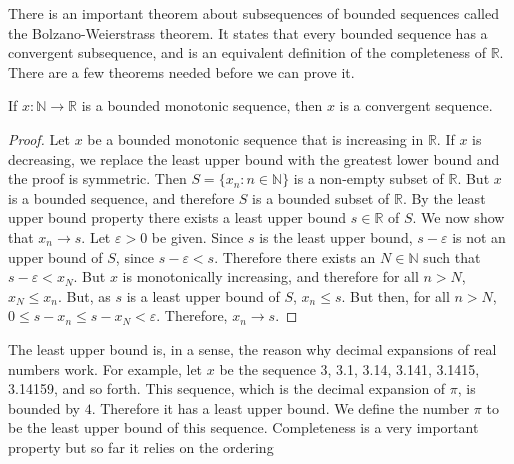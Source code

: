         There is an important theorem about
        subsequences of bounded sequences called the
        Bolzano-Weierstrass theorem. It states that
        every bounded sequence has a convergent subsequence,
        and is an equivalent definition of the
        completeness of $\mathbb{R}$. There are a few theorems
        needed before we can prove it.
        \begin{theorem}
            \label{th:funct:bounded_monotone_%
                   sequences_converge}
            If $x:\mathbb{N}\rightarrow\mathbb{R}$
            is a bounded monotonic sequence,
            then $x$ is a convergent sequence.
        \end{theorem}
        \begin{proof}
            Let $x$ be a bounded monotonic sequence that
            is increasing in $\mathbb{R}$.
            If $x$ is decreasing, we replace the least
            upper bound with the greatest lower
            bound and the proof is symmetric.
            Then $S=\{x_{n}:n\in\mathbb{N}\}$ is a
            non-empty subset of $\mathbb{R}$. But $x$ is
            a bounded sequence, and therefore $S$ is a
            bounded subset of $\mathbb{R}$. By the least
            upper bound property there exists a least
            upper bound $s\in\mathbb{R}$ of $S$.
            We now show that $x_{n}\rightarrow{s}$.
            Let $\varepsilon>0$ be given. Since $s$ is
            the least upper bound, $s-\varepsilon$
            is not an upper bound of $S$, since
            $s-\varepsilon<s$. Therefore there exists
            an $N\in\mathbb{N}$ such that
            $s-\varepsilon<x_{N}$. But $x$ is
            monotonically increasing, and therefore
            for all $n>N$, $x_{N}\leq{x_{n}}$.
            But, as $s$ is a least upper
            bound of $S$, $x_{n}\leq{s}$. But then,
            for all $n>N$,
            $0\leq{s-x_{n}}\leq{s-x_{N}}<\varepsilon$.
            Therefore, $x_{n}\rightarrow{s}$.
        \end{proof}
        The least upper bound is, in a sense, the
        reason why decimal expansions of
        real numbers work. For example, let $x$ be the
        sequence 3, 3.1, 3.14, 3.141, 3.1415, 3.14159,
        and so forth. This sequence, which is
        the decimal expansion of $\pi$, is bounded by $4$.
        Therefore it has a least upper bound.
        We define the number $\pi$
        to be the least upper bound of this sequence.
        Completeness is a very important property
        but so far it relies on the ordering

